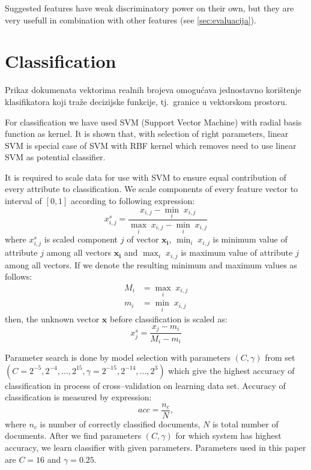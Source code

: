 \documentclass[11pt,english]{article}
\begin{document}
\begin{multicols}{2}
Suggested features have weak discriminatory power on their own, but they are
very usefull in combination with other features (see \ref{sec:evaluacija}).

\section{Classification}
Prikaz dokumenata vektorima realnih brojeva omogućava jednostavno korištenje
klasifikatora koji traže decizijske funkcije, tj.\ granice u vektorskom
prostoru.

For classification we have used SVM (Support Vector Machine) with radial basis
function as kernel. It is shown that, with selection of right parameters, linear
SVM is special case of SVM with RBF kernel \citep{keerthi2003asymptotic} which
removes need to use linear SVM as potential classifier.

It is required to scale data for use with SVM to ensure equal contribution of
every attribute to classification. We scale components of every feature vector
to interval of $[0, 1]$ according to following expression:
\begin{equation}
x^{s}_{i,j} = \frac{x_{i,j} - \min_{i}\; x_{i,j}}{\max_{i}\; x_{i,j}
- \min_{i}\; x_{i,j}}
\end{equation}
where $x^{s}_{i,j}$ is scaled component $j$ of vector $\mathbf{x_i}$,
$\min_{i}\; x_{i,j}$ is minimum value of attribute $j$ among all vectors
$\mathbf{x_i}$ and $\max_{i}\; x_{i,j}$ is maximum value of attribute $j$ among
all vectors. If we denote the resulting minimum and maximum values as follows:
\begin{eqnarray}
M_i & = \max_{i}\; x_{i,j} \\
m_i & = \min_{i}\; x_{i,j}
\end{eqnarray}
then, the unknown vector $\mathbf{x}$ before classification is scaled as:
\begin{equation}
x^{s}_{j} = \frac{x_j-m_i}{M_i-m_i}
\end{equation}

Parameter search is done by model selection with parameters $(C, \gamma)$ from
set $\left (C = {2^{-5}, 2^{-4}, \ldots , 2^{15}},  \gamma = {2^{-15}, 2^{-14},
\ldots, 2^3} \right )$ \citep{CC01a} which give the highest accuracy of
classification in process of cross--validation on learning data set. Accuracy
of classification is measured by expression:
\begin{equation}
acc = \frac{n_c}{N},
\end{equation}
where $n_c$ is number of correctly classified documents, $N$ is total number of
documents. After we find parameters $(C, \gamma)$ for which system has highest
accuracy, we learn classifier with given parameters. Parameters used in this
paper are $C = 16$ and $\gamma = 0.25$.



\end{multicols}
\end{document}
